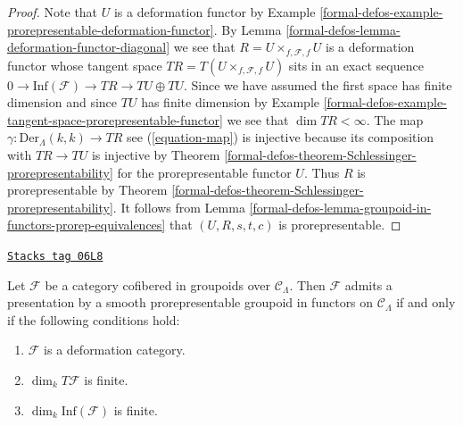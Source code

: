 \begin{proof}
Note that $U$ is a deformation functor by
Example \ref{formal-defos-example-prorepresentable-deformation-functor}.
By
Lemma \ref{formal-defos-lemma-deformation-functor-diagonal}
we see that $R = U \times_{f, \mathcal{F}, f} U$
is a deformation functor whose tangent space
$TR = T(U \times_{f, \mathcal{F}, f} U)$ sits in an exact sequence
$0 \to \text{Inf}(\mathcal{F}) \to TR \to TU \oplus TU$.
Since we have assumed the first space has finite dimension and since
$TU$ has finite dimension by
Example \ref{formal-defos-example-tangent-space-prorepresentable-functor}
we see that $\dim TR < \infty$. The map
$\gamma : \text{Der}_\Lambda(k, k) \to TR$ see (\ref{equation-map})
is injective because its composition with $TR \to TU$ is injective by
Theorem \ref{formal-defos-theorem-Schlessinger-prorepresentability}
for the prorepresentable functor $U$. Thus $R$ is prorepresentable by
Theorem \ref{formal-defos-theorem-Schlessinger-prorepresentability}.
It follows from
Lemma \ref{formal-defos-lemma-groupoid-in-functors-prorep-equivalences}
that $(U, R, s, t, c)$ is prorepresentable.
\end{proof}

\begin{theorem}
\label{formal-defos-theorem-presentation-deformation-groupoid}
\href{https://stacks.math.columbia.edu/tag/06L8}{\texttt{Stacks tag 06L8}}

Let $\mathcal{F}$ be a category cofibered in groupoids over
$\mathcal{C}_\Lambda$. Then $\mathcal{F}$ admits a presentation by a
smooth prorepresentable groupoid in functors on $\mathcal{C}_\Lambda$
if and only if the following conditions hold:
\begin{enumerate}
\item $\mathcal{F}$ is a deformation category.
\item $\dim_k T\mathcal{F}$ is finite.
\item $\dim_k \text{Inf}(\mathcal{F})$ is finite.
\end{enumerate}
\end{theorem}


